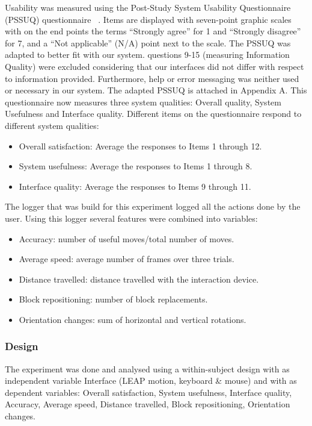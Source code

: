 Usability was measured using the Post-Study System Usability Questionnaire (PSSUQ) questionnaire ~\cite{lewis1992psychometric}. Items are displayed with seven-point graphic scales with on the end points the terms “Strongly agree” for 1 and “Strongly disagree” for 7, and a “Not applicable” (N/A) point next to the scale. The PSSUQ was adapted to better fit with our system. questions 9-15 (measuring Information Quality) were excluded considering that our interfaces did not differ with respect to information provided. Furthermore, help or error messaging was neither used or necessary in our system. The adapted PSSUQ is attached in Appendix A. This questionnaire now measures three system qualities: Overall quality, System Usefulness and Interface quality.  Different items on the questionnaire respond to different system qualities:
\begin{itemize}
	\item Overall satisfaction: Average the responses to Items 1 through 12.
	\item System usefulness: Average the responses to Items 1 through 8.
    \item Interface quality: Average the responses to Items 9 through 11.
\end{itemize}

The logger that was build for this experiment logged all the actions done by the user. Using this logger several features were combined into variables: 
\begin{itemize}
	\item Accuracy: number of useful moves/total number of moves.
	\item Average speed: average number of frames over three trials.    
	\item Distance travelled: distance travelled with the interaction device.
    \item Block repositioning: number of block replacements.
    \item Orientation changes: sum of horizontal and vertical rotations.
\end{itemize}


\subsubsection{Design}
The experiment was done and analysed using a within-subject design with as independent variable Interface (LEAP motion, keyboard \& mouse) and with as dependent variables: Overall satisfaction, System usefulness, Interface quality, Accuracy, Average speed, Distance travelled, Block repositioning, Orientation changes. 

